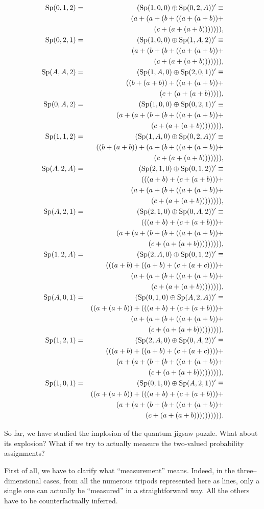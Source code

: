\documentclass[%
  preprint,
 showpacs,
 showkeys,
 preprintnumbers,
 amsmath,amssymb,
 aps,
 rmp,
  longbibliography,
 ]{revtex4-1}
\begin{document}
{\begin {eqnarray*}
\gen 01210002A (a+(a+(b+((a+(a+b))+\\*%
&&(c+(a+(a+b))))))),\\
\gen 0211001A2 (a+(b+(b+((a+(a+b))+\\*%
&&(c+(a+(a+b))))))),\\
\gen AA21A0201 ((b+(a+b))+((a+(a+b))+\\*%
&&(c+(a+(a+b))))),\\
\gen 0A2100021 (a+(a+(b+(b+((a+(a+b))+\\*%
&&(c+(a+(a+b)))))))),\\
\gen 1121A002A ((b+(a+b))+(a+(b+((a+(a+b))+\\*%
                && (c+(a+(a+b))))))),\\
\gen A2A210012 (((a+b)+(c+(a+b)))+\\*%
               &&(a+(a+(b+((a+(a+b))+\\*%
               &&(c+(a+(a+b)))))))),\\
\gen A212100A2 (((a+b)+(c+(a+b)))+\\*%
               &&(a+(a+(b+(b+((a+(a+b))+\\*%
               &&(c+(a+(a+b))))))))),\\
\gen 12A2A0012 (((a+b)+((a+b)+(c+(a+c))))+\\*%
               &&(a+(a+(b+((a+(a+b))+\\*%
               &&(c+(a+(a+b)))))))),\\
\gen A01010A2A ((a+(a+b))+(((a+b)+(c+(a+b)))+\\*%
               &&(a+(a+(b+((a+(a+b))+\\*%
               &&(c+(a+(a+b))))))))),\\
\gen 1212A00A2 (((a+b)+((a+b)+(c+(a+c))))+\\*%
               &&(a+(a+(b+(b+((a+(a+b))+\\*%
               &&(c+(a+(a+b))))))))),\\
\gen 101010A21 ((a+(a+b))+(((a+b)+(c+(a+b)))+\\*%
               &&(a+(a+(b+(b+((a+(a+b))+\\*%
               &&(c+(a+(a+b)))))))))).
\end{eqnarray*}
}



So far, we have studied the implosion of the quantum jigsaw puzzle.
What about its explosion?
What if we try to actually measure the two-valued probability
assignments?

First of all, we have to clarify what ``measurement'' means. Indeed, in
the three--dimensional cases, from all the numerous tripods represented
here as lines, only a single one can actually be ``measured'' in a
straightforward way. All the others have to be counterfactually
inferred.
\end{document}
